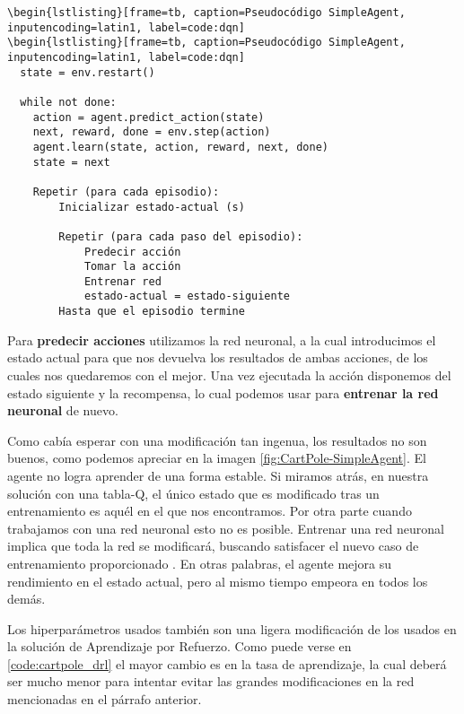 \begin{minipage}{0.9\linewidth}%
\begin{lstlisting}[frame=tb, caption=Pseudocódigo SimpleAgent, inputencoding=latin1, label=code:dqn]      
    \begin{lstlisting}[frame=tb, caption=Pseudocódigo SimpleAgent, inputencoding=latin1, label=code:dqn]
\begin{lstlisting}[frame=tb, caption=Pseudocódigo SimpleAgent, inputencoding=latin1, label=code:dqn]      
  state = env.restart()
    
  while not done:
    action = agent.predict_action(state)
    next, reward, done = env.step(action)
    agent.learn(state, action, reward, next, done)
    state = next
        
    Repetir (para cada episodio):
        Inicializar estado-actual (s)
        
        Repetir (para cada paso del episodio):
            Predecir acción
            Tomar la acción
            Entrenar red
            estado-actual = estado-siguiente
        Hasta que el episodio termine
    \end{lstlisting}%
\end{minipage}

Para \textbf{predecir acciones} utilizamos la red neuronal, a la cual introducimos el estado actual para que nos devuelva los resultados de ambas acciones, de los cuales nos quedaremos con el mejor. Una vez ejecutada la acción disponemos del estado siguiente y la recompensa, lo cual podemos usar para \textbf{entrenar la red neuronal} de nuevo.

Como cabía esperar con una modificación tan ingenua, los resultados no son buenos, como podemos apreciar en la imagen \ref{fig:CartPole-SimpleAgent}. El agente no logra aprender de una forma estable. Si miramos atrás, en nuestra solución con una tabla-Q, el único estado que es modificado tras un entrenamiento es aquél en el que nos encontramos. Por otra parte cuando trabajamos con una red neuronal esto no es posible. Entrenar una red neuronal implica que toda la red se modificará, buscando satisfacer el nuevo caso de entrenamiento proporcionado \citep{Buduma:backprop}. En otras palabras, el agente mejora su rendimiento en el estado actual, pero al mismo tiempo empeora en todos los demás.

Los hiperparámetros usados también son una ligera modificación de los usados en la solución de Aprendizaje por Refuerzo. Como puede verse en \ref{code:cartpole_drl} el mayor cambio es en la tasa de aprendizaje, la cual deberá ser mucho menor para intentar evitar las grandes modificaciones en la red mencionadas en el párrafo anterior.

